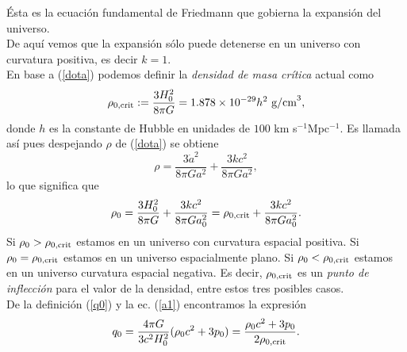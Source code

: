 Ésta es la ecuación fundamental de Friedmann \cite{friedmann} que gobierna la expansión del universo.\\
De aquí vemos que la expansión sólo puede detenerse en un universo con curvatura positiva, es decir $k=1$.\\
En base a (\ref{dota}) podemos definir la \textit{densidad de masa crítica} actual como
\begin{equation}
\rho_{0\rm{,crit}}:= \frac{3H_0^2}{8\pi G} = 1.878\times 10^{-29} h^2 \mbox{ g/cm}^3,
\end{equation}
donde $h$ es la constante de Hubble en unidades de $100$ km s$^{-1}$Mpc$^{-1}$. Es llamada así pues despejando $\rho$ de
(\ref{dota}) se obtiene
\begin{equation}
\rho = \frac{3\dot a^2}{8\pi Ga^2} + \frac{3kc^2}{8\pi Ga^2}, \label{densidad}
\end{equation}
lo que significa que
\begin{equation}
\rho_0 = \frac{3 H_0^2}{8\pi G} + \frac{3kc^2}{8\pi Ga_0^2} = \rho_{0\rm{,crit}} + \frac{3kc^2}{8\pi Ga_0^2}. 
\end{equation}
Si $\rho_0 > \rho_{0\rm{,crit}}$ estamos en un universo con curvatura espacial positiva.
Si $\rho_0=\rho_{0\rm{,crit}}$ estamos en un universo espacialmente plano. Si $\rho_0<\rho_{0\rm{,crit}}$ estamos en un universo curvatura espacial negativa.
Es decir, $\rho_{0\rm{,crit}}$ es un \textit{punto de inflección} para el valor de la densidad, entre estos tres posibles casos.\\
De la definición (\ref{q0}) y la ec. (\ref{a1}) encontramos la expresión
\begin{equation}
q_{0}=\frac{4\pi G}{3c^2 H_0^2}(\rho_0 c^2 +3p_0)=\frac{\rho_0 c^2 +3p_0}{2\rho_{0\rm{,crit}}} . \label{q00}
\end{equation}

